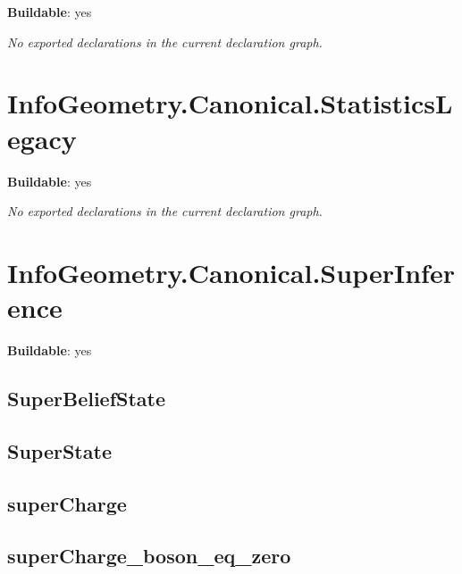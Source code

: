 \noindent\textbf{Buildable}: yes

\noindent\emph{No exported declarations in the current declaration graph.}

\section{InfoGeometry.Canonical.StatisticsLegacy}

\noindent\textbf{Buildable}: yes

\noindent\emph{No exported declarations in the current declaration graph.}

\section{InfoGeometry.Canonical.SuperInference}

\noindent\textbf{Buildable}: yes

\subsection*{SuperBeliefState}

\begin{theorem}[blueprint="infogeometry:canonical:superinference:superbeliefstate"]
\end{theorem}

\subsection*{SuperState}

\begin{theorem}[blueprint="infogeometry:canonical:superinference:superstate"]
\end{theorem}

\subsection*{superCharge}

\begin{theorem}[blueprint="infogeometry:canonical:superinference:supercharge"]
\end{theorem}

\subsection*{superCharge_boson_eq_zero}

